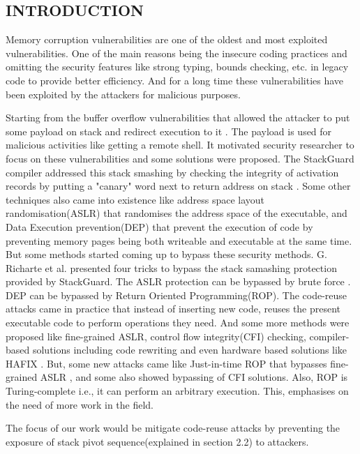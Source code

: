 \documentclass{article}
\begin{document}
	\begin{multicols}{2}
	\section{INTRODUCTION}
	Memory corruption vulnerabilities are one of the oldest and most exploited vulnerabilities. One of the main reasons being the insecure coding practices and omitting the security features like strong typing, bounds checking, etc. in legacy code to provide better efficiency. And for a long time these vulnerabilities have been exploited by the attackers for malicious purposes.

	Starting from the buffer overflow vulnerabilities that allowed the attacker to put some payload on stack and redirect execution to it \cite{aleph}. The payload is used for malicious activities like getting a remote shell. It motivated security researcher to focus on these vulnerabilities and some solutions were proposed. The StackGuard compiler addressed this stack smashing by checking the integrity of activation records by putting a "canary" word next to return address on stack \cite{stackguard}. Some other techniques also came into existence like address space layout randomisation(ASLR) \cite{pax} that randomises the address space of the executable, and Data Execution prevention(DEP) that prevent the execution of code by preventing memory pages being both writeable and executable at the same time. But some methods started coming up to bypass these security methods. G. Richarte et al. \cite{4trick} presented four tricks to bypass the stack samashing protection provided by StackGuard. The ASLR protection can be bypassed by brute force \cite{effaslr}. DEP can be bypassed by Return Oriented Programming(ROP). The code-reuse  attacks came in practice that instead of inserting new code, reuses the present executable code to perform operations they need. And some more methods were proposed like fine-grained ASLR, control flow integrity(CFI) checking, compiler-based solutions including code rewriting and even hardware based solutions like HAFIX \cite{hafix}. But, some new attacks came like Just-in-time ROP that bypasses fine-grained ASLR \cite{jitrop}, and some also showed bypassing of CFI solutions. Also, ROP is Turing-complete i.e., it can perform an arbitrary execution. This, emphasises on the need of more work in the field.
	
	The focus of our work would be mitigate code-reuse attacks by preventing the exposure of stack pivot sequence(explained in section 2.2) to attackers.
	

\end{multicols}
\end{document}

